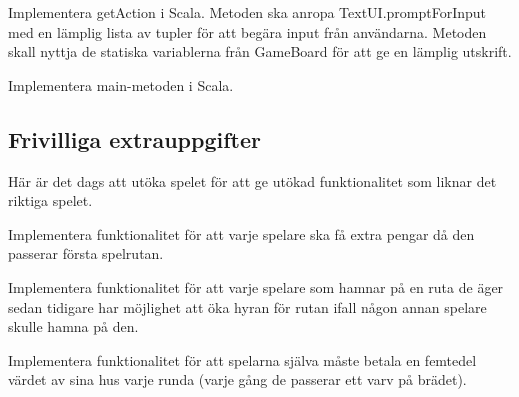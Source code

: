 \Subtask Implementera getAction i Scala. Metoden ska anropa TextUI.promptForInput med en lämplig lista av tupler för att begära input från användarna. Metoden skall nyttja de statiska variablerna från GameBoard för att ge en lämplig utskrift.

\Subtask Implementera main-metoden i Scala.




\subsection{Frivilliga extrauppgifter}

\Task Här är det dags att utöka spelet för att ge utökad funktionalitet som liknar det riktiga spelet.

\Subtask Implementera funktionalitet för att varje spelare ska få extra pengar då den passerar första spelrutan.

\Subtask Implementera funktionalitet för att varje spelare som hamnar på en ruta de äger sedan tidigare har möjlighet att öka hyran för rutan ifall någon annan spelare skulle hamna på den.

\Subtask Implementera funktionalitet för att spelarna själva måste betala en femtedel värdet av sina hus varje runda (varje gång de passerar ett varv på brädet).
    
